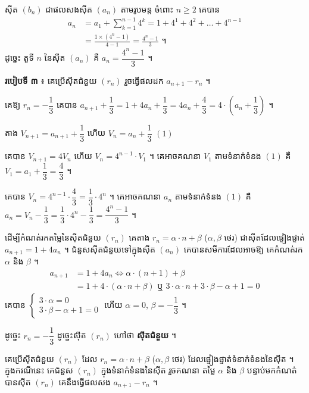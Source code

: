 ស៊ីត $(b_n)$ ជាផលសងស៊ីត $(a_n)$ តាមរូបមន្ត ចំពោះ $n \ge 2$ គេបាន
\[
\begin{aligned}
a_n &= a_1 + \sum_{k=1}^{n-1} 4^k = 1 + 4^1 + 4^2 + \ldots + 4^{n-1}\\
&= \frac{1 \times (4^n - 1)}{4 - 1} = \frac{4^n - 1}{3} \text{ ។}
\end{aligned}
\]
ដូច្នេះ តួទី $n$ នៃស៊ីត $(a_n)$ គឺ $a_n = \dfrac{4^n - 1}{3}$ ។

\textbf{របៀបទី ៣} ៖ គេប្រើស៊ីតជំនួយ $(r_n)$ រួចធ្វើផលដក $a_{n+1} - r_n$ ។

គេឱ្យ $r_n = -\dfrac{1}{3}$ គេបាន $a_{n+1} + \dfrac{1}{3} = 1 + 4a_n + \dfrac{1}{3} = 4a_n + \dfrac{4}{3} = 4 \cdot \left(a_n + \dfrac{1}{3}\right)$ ។

តាង $V_{n+1} = a_{n+1} + \dfrac{1}{3}$ ហើយ $V_n = a_n + \dfrac{1}{3}$ \quad $(1)$

គេបាន $V_{n+1} = 4V_n$ ហើយ $V_n = 4^{n-1} \cdot V_1$ ។ គេអាចគណនា $V_1$ តាមទំនាក់ទំនង $(1)$ គឺ $V_1 = a_1 + \dfrac{1}{3} = \dfrac{4}{3}$ ។

គេបាន $V_n = 4^{n-1} \cdot \dfrac{4}{3} = \dfrac{1}{3} \cdot 4^n$ ។ គេអាចគណនា $a_n$ តាមទំនាក់ទំនង $(1)$ គឺ $a_n = V_n - \dfrac{1}{3} = \dfrac{1}{3} \cdot 4^n - \dfrac{1}{3} = \dfrac{4^n - 1}{3}$ ។

\begin{note}
ដើម្បីកំណត់រកតម្លៃនៃស៊ីតជំនួយ $(r_n)$ គេតាង $r_n = \alpha \cdot n + \beta$ ($\alpha, \beta$ ថេរ) ជាស៊ីតដែលផ្ទៀងផ្ទាត់ $a_{n+1} = 1 + 4a_n$ ។ ជំនួសស៊ីតជំនួយទៅក្នុងស៊ីត $(a_n)$ គេបានសមីការដែលអាចឱ្យ គេកំណត់រក $\alpha$ និង $\beta$ ។
\[
\begin{aligned}
a_{n+1} &= 1 + 4a_n \iff \alpha \cdot (n + 1) + \beta\\
&= 1 + 4 \cdot (\alpha \cdot n + \beta) \text{ ឬ } 3 \cdot \alpha \cdot n + 3 \cdot \beta - \alpha + 1 = 0
\end{aligned}
\]
គេបាន $\begin{cases} 3 \cdot \alpha = 0\\ 3 \cdot \beta - \alpha + 1 = 0 \end{cases}$ ហើយ $\alpha = 0$, $\beta = -\dfrac{1}{3}$ ។

ដូច្នេះ $r_n = -\dfrac{1}{3}$ ដូច្នេះស៊ីត $(r_n)$ ហៅថា \textbf{ស៊ីតជំនួយ} ។
\end{note}

\begin{formulaBox}[ជាទូទៅ]
គេប្រើស៊ីតជំនួយ $(r_n)$ ដែល $r_n = \alpha \cdot n + \beta$ ($\alpha, \beta$ ថេរ) ដែលផ្ទៀងផ្ទាត់ទំនាក់ទំនងនៃស៊ីត ។ ក្នុងករណីនេះ គេជំនួស $(r_n)$ ក្នុងទំនាក់ទំនងនៃស៊ីត រួចគណនា តម្លៃ $\alpha$ និង $\beta$ បន្ទាប់មកកំណត់បានស៊ីត $(r_n)$ គេនឹងធ្វើផលសង $a_{n+1} - r_n$ ។
\end{formulaBox}

